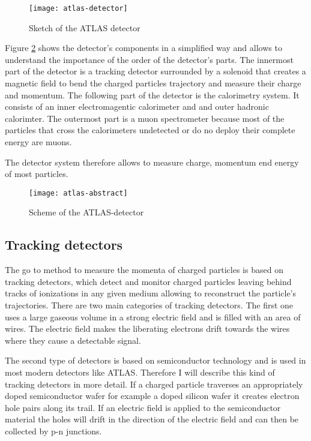 \begin{figure}[h]
  \centering
  \texttt{[image: atlas-detector]}
  \caption[Sketch of the ATLAS detector]{Sketch of the ATLAS detector \cite{atlasfigures}}
  \label{fig:atlas}
\end{figure}

Figure \ref{fig:atlas_sketch} shows the detector's components in a simplified way and allows to understand the importance of the order of the detector's parts. The innermost part of the detector is a tracking detector surrounded by a solenoid that creates a magnetic field to bend the charged particles trajectory and measure their charge and momentum.
The following part of the detector is the calorimetry system. It consists of an inner electromagentic calorimeter and and outer hadronic calorimter. The outermost part is a muon spectrometer because most of the particles that cross the calorimeters undetected or do no deploy their complete energy are muons.

The detector system therefore allows to measure charge, momentum end energy of most particles.


\begin{figure}[h]
  \centering
  \texttt{[image: atlas-abstract]}
  \caption[Sketch of the transversal section of the ATLAS detector]{Scheme of the ATLAS-detector \cite{atlasfigures}}
  \label{fig:atlas_sketch}
\end{figure}

\subsection{Tracking detectors}

The go to method to measure the momenta of charged particles is based on tracking detectors, which detect and monitor charged particles leaving behind tracks of ionizations in any given medium allowing to reconstruct the particle's trajectories.
There are two main categories of tracking detectors. The first one uses a large gaseous volume in a strong electric field and is filled with an area of wires. The electric field makes the liberating electrons drift towards the wires where they cause a detectable signal.

The second type of detectors is based on semiconductor technology and is used in most modern detectors like ATLAS. Therefore I will describe this kind of tracking detectors in more detail.
If a charged particle traverses an appropriately doped semiconductor wafer for example a doped silicon wafer it creates electron hole pairs along its trail. If an electric field is applied to the semiconductor material the holes will drift in the direction of the electric field and can then be collected by p-n junctions.

